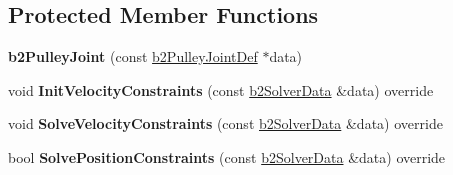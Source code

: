 \subsection*{Protected Member Functions}
\begin{DoxyCompactItemize}
\item 
\mbox{\label{classb2_pulley_joint_aca1b8dc6fb05c134ccbc0423674c1867}} 
{\bfseries b2\+Pulley\+Joint} (const \hyperlink{structb2_pulley_joint_def}{b2\+Pulley\+Joint\+Def} $\ast$data)
\item 
\mbox{\label{classb2_pulley_joint_a1826611f1dfe6284c3ce3afdab875e94}} 
void {\bfseries Init\+Velocity\+Constraints} (const \hyperlink{structb2_solver_data}{b2\+Solver\+Data} \&data) override
\item 
\mbox{\label{classb2_pulley_joint_a80de874e392a8238fd2e965f5080222b}} 
void {\bfseries Solve\+Velocity\+Constraints} (const \hyperlink{structb2_solver_data}{b2\+Solver\+Data} \&data) override
\item 
\mbox{\label{classb2_pulley_joint_ac3d5f78f3bdd248ca368add8f21b7e95}} 
bool {\bfseries Solve\+Position\+Constraints} (const \hyperlink{structb2_solver_data}{b2\+Solver\+Data} \&data) override
\end{DoxyCompactItemize}
